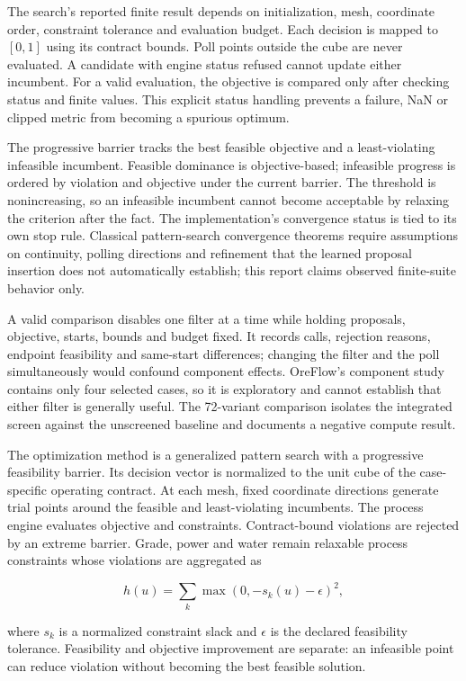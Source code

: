 \documentclass[10pt]{article}
\begin{document}
The search's reported finite result depends on initialization, mesh,
coordinate order, constraint tolerance and evaluation budget. Each
decision is mapped to \([0,1]\) using its contract bounds. Poll points
outside the cube are never evaluated. A candidate with engine status
refused cannot update either incumbent. For a valid evaluation, the
objective is compared only after checking status and finite values. This
explicit status handling prevents a failure, NaN or clipped metric from
becoming a spurious optimum.

The progressive barrier tracks the best feasible objective and a
least-violating infeasible incumbent. Feasible dominance is
objective-based; infeasible progress is ordered by violation and
objective under the current barrier. The threshold is nonincreasing, so
an infeasible incumbent cannot become acceptable by relaxing the
criterion after the fact. The implementation's convergence status is
tied to its own stop rule. Classical pattern-search convergence theorems
require assumptions on continuity, polling directions and refinement
that the learned proposal insertion does not automatically establish;
this report claims observed finite-suite behavior only.

A valid comparison disables one filter at a time while holding proposals,
objective, starts, bounds and budget fixed. It records calls, rejection
reasons, endpoint feasibility and same-start differences; changing the
filter and the poll simultaneously would confound component effects.
OreFlow's component study contains only four selected cases, so it is
exploratory and cannot establish that either filter is generally useful.
The 72-variant comparison isolates the integrated screen against the
unscreened baseline and documents a negative compute result.

The optimization method is a generalized pattern search with a
progressive feasibility barrier. Its decision vector is normalized to
the unit cube of the case-specific operating contract. At each mesh,
fixed coordinate directions generate trial points around the feasible
and least-violating incumbents. The process engine evaluates
objective and constraints. Contract-bound violations are rejected by an
extreme barrier. Grade, power and water remain relaxable process
constraints whose violations are aggregated as

\[h(u)=\sum_{k}\max(0,-s_k(u)-\epsilon)^2,\]

where \(s_k\) is a normalized constraint slack and \(\epsilon\) is the
declared feasibility tolerance. Feasibility and objective improvement
are separate: an infeasible point can reduce violation without becoming
the best feasible solution.
\end{document}
